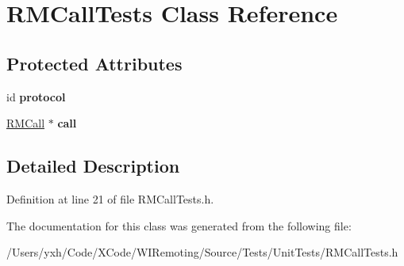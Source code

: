 \hypertarget{interface_r_m_call_tests}{
\section{RMCallTests Class Reference}
\label{interface_r_m_call_tests}
}
\subsection*{Protected Attributes}
\begin{DoxyCompactItemize}
\item 
\hypertarget{interface_r_m_call_tests_a09775bdf02a3dd357630f87e2263a055}{
id {\bfseries protocol}}
\label{interface_r_m_call_tests_a09775bdf02a3dd357630f87e2263a055}

\item 
\hypertarget{interface_r_m_call_tests_acf178ef7ba187366a43cf708ba587051}{
\hyperlink{interface_r_m_call}{RMCall} $\ast$ {\bfseries call}}
\label{interface_r_m_call_tests_acf178ef7ba187366a43cf708ba587051}

\end{DoxyCompactItemize}


\subsection{Detailed Description}


Definition at line 21 of file RMCallTests.h.

The documentation for this class was generated from the following file:\begin{DoxyCompactItemize}
\item 
/Users/yxh/Code/XCode/WIRemoting/Source/Tests/UnitTests/RMCallTests.h\end{DoxyCompactItemize}
